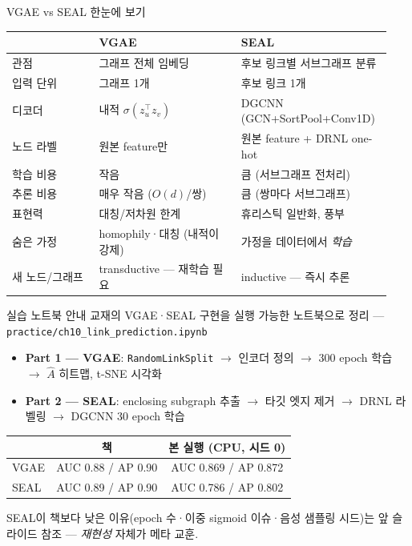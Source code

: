 \begin{frame}{VGAE vs SEAL 한눈에 보기}
\small
\begin{tabular}{p{0.22\linewidth} p{0.36\linewidth} p{0.36\linewidth}}
\toprule
 & \textbf{VGAE} & \textbf{SEAL} \\
\midrule
관점     & 그래프 전체 임베딩          & 후보 링크별 서브그래프 분류 \\
입력 단위 & 그래프 1개                  & 후보 링크 1개 \\
디코더   & 내적 $\sigma(z_u^\top z_v)$ & DGCNN (GCN+SortPool+Conv1D) \\
노드 라벨 & 원본 feature만             & 원본 feature + DRNL one-hot \\
학습 비용 & 작음                        & 큼 (서브그래프 전처리) \\
추론 비용 & 매우 작음 ($O(d)$/쌍)       & 큼 (쌍마다 서브그래프) \\
표현력   & 대칭/저차원 한계           & 휴리스틱 일반화, 풍부 \\
숨은 가정 & homophily·대칭 (내적이 강제) & 가정을 데이터에서 \emph{학습} \\
새 노드/그래프 & transductive — 재학습 필요 & inductive — 즉시 추론 \\
\bottomrule
\end{tabular}
\end{frame}

\begin{frame}{실습 노트북 안내}
교재의 VGAE·SEAL 구현을 실행 가능한 노트북으로 정리 — \texttt{practice/ch10\_link\_prediction.ipynb}
\begin{itemize}
  \item \textbf{Part 1 — VGAE}: \texttt{RandomLinkSplit} $\to$ 인코더 정의 $\to$ 300 epoch 학습 $\to$ $\hat{A}$ 히트맵, t-SNE 시각화
  \item \textbf{Part 2 — SEAL}: enclosing subgraph 추출 $\to$ 타깃 엣지 제거 $\to$ DRNL 라벨링 $\to$ DGCNN 30 epoch 학습
\end{itemize}
\vspace{0.4em}
\small
\begin{tabular}{l c c}
\toprule
 & \textbf{책} & \textbf{본 실행 (CPU, 시드 0)} \\
\midrule
VGAE & AUC 0.88 / AP 0.90 & AUC 0.869 / AP 0.872 \\
SEAL & AUC 0.89 / AP 0.90 & AUC 0.786 / AP 0.802 \\
\bottomrule
\end{tabular}
\vspace{0.4em}
\footnotesize

SEAL이 책보다 낮은 이유(epoch 수·이중 sigmoid 이슈·음성 샘플링 시드)는 앞 슬라이드 참조 — \emph{재현성} 자체가 메타 교훈.
\end{frame}


